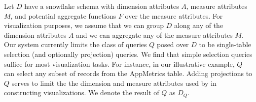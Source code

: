 Let $D$ have a snowflake schema with 
dimension attributes $A$, measure attributes $M$, and potential
aggregate functions $F$ over the measure attributes. 
For visualization purposes, we assume that we can group $D$ along any of the dimension attributes $A$ 
and we can aggregate any of the measure attributes $M$.
Our system currently limits the class of queries $Q$ posed over $D$ to be single-table
selection (and optionally projection) queries.
We find that simple selection queries suffice for most visualization tasks.
For instance, in our illustrative example, $Q$ can select any subset of records from the
AppMetrics table. 
Adding projections to $Q$ serves to limit the the dimension and measure 
attributes used by \SeeDB in constructing visualizations.
We denote the result of $Q$ as $D_Q$.
\fi
